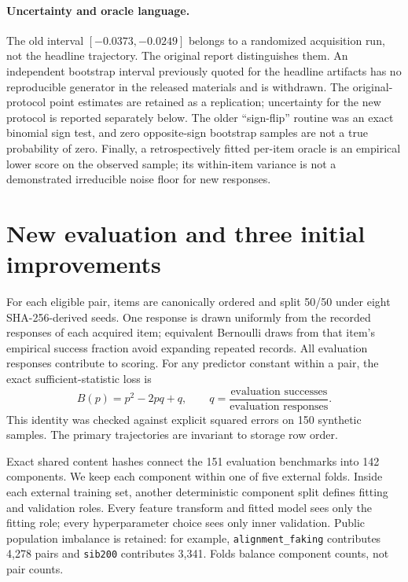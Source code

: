 \documentclass{article}
\begin{document}
\paragraph{Uncertainty and oracle language.}
The old interval $[-0.0373,-0.0249]$ belongs to a randomized acquisition run,
not the headline trajectory. The original report distinguishes them. An
independent bootstrap interval previously quoted for the headline artifacts
has no reproducible generator in the released materials and is withdrawn.
The original-protocol point estimates are retained as a replication;
uncertainty for the new protocol is reported separately below.
The older ``sign-flip'' routine was an exact binomial sign test, and zero
opposite-sign bootstrap samples are not a true probability of zero.
Finally, a retrospectively fitted per-item oracle is an empirical lower
score on the observed sample; its within-item variance is not a demonstrated
irreducible noise floor for new responses.

\section{New evaluation and three initial improvements}
For each eligible pair, items are canonically ordered and split 50/50 under
eight SHA-256-derived seeds. One response is drawn uniformly from the recorded
responses of each acquired item; equivalent Bernoulli draws from that item's
empirical success fraction avoid expanding repeated records. All evaluation
responses contribute to scoring. For any predictor constant within a pair,
the exact sufficient-statistic loss is
\begin{equation}
 B(p)=p^2-2pq+q,\qquad q=\frac{\text{evaluation successes}}{\text{evaluation responses}}.
\end{equation}
This identity was checked against explicit squared errors on 150 synthetic
samples. The primary trajectories are invariant to storage row order.

Exact shared content hashes connect the 151 evaluation benchmarks into
142 components. We keep each component within one of five external folds.
Inside each external training set, another deterministic component split
defines fitting and validation roles. Every feature transform and fitted
model sees only the fitting role; every hyperparameter choice sees only
inner validation. Public population imbalance is retained: for example,
\texttt{alignment\_faking} contributes 4,278 pairs and \texttt{sib200}
contributes 3,341. Folds balance component counts, not pair counts.
\end{document}
